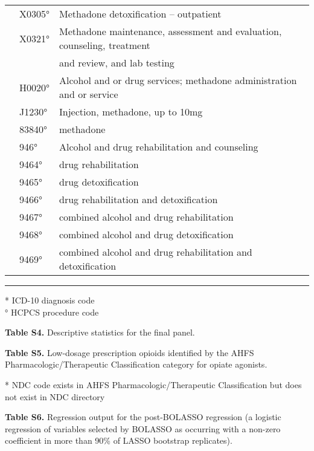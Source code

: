 \documentclass[9pt,twoside,lineno]{pnas-new}
\begin{document}
\begin{tabular}{lll}
 & X0305° & Methadone detoxification – outpatient \\
 & X0321° & Methadone maintenance, assessment and evaluation, counseling, treatment \\
 &  & and review, and lab testing \\
 & H0020° & Alcohol and or drug services; methadone administration and or service \\
 & J1230° & Injection, methadone, up to 10mg \\
 & 83840° & methadone \\
 & 946° & Alcohol and drug rehabilitation and counseling \\
 & 9464° & drug rehabilitation \\
 & 9465° & drug detoxification \\
 & 9466° & drug rehabilitation and detoxification \\
 & 9467° & combined alcohol and drug rehabilitation \\
 & 9468° & combined alcohol and drug detoxification \\
 & 9469° & combined alcohol and drug rehabilitation and detoxification \\[1em]
\end{tabular}

\hrule

\footnotesize
* ICD-10 diagnosis code \\
° HCPCS procedure code
\normalsize

\newpage

\textbf{Table S4.} Descriptive statistics for the final panel.



\newpage

\textbf{Table S5.} Low-dosage prescription opioids identified by the AHFS Pharmacologic/Therapeutic Classification category for opiate agonists.

\tiny


* NDC code exists in AHFS Pharmacologic/Therapeutic Classification but does not exist in NDC directory
\normalsize

\newpage

\textbf{Table S6.} Regression output for the post-BOLASSO regression (a logistic regression of variables selected by BOLASSO as occurring with a non-zero coefficient in more than 90\% of LASSO bootstrap replicates).

\scriptsize

\normalsize
\end{document}

